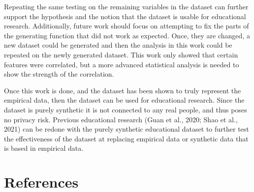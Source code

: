 \documentclass{article}
\begin{document}
\label{sec:future_work}

Repeating the same testing on the remaining variables in the dataset can further support the hypothesis and the notion that the dataset is usable for educational research. Additionally, future work should focus on attempting to fix the parts of the generating function that did not work as expected. Once, they are changed, a new dataset could be generated and then the analysis in this work could be repeated on the newly generated dataset. This work only showed that certain features were correlated, but a more advanced statistical analysis is needed to show the strength of the correlation.

Once this work is done, and the dataset has been shown to truly represent the empirical data, then the dataset can be used for educational research. Since the dataset is purely synthetic it is not connected to any real people, and thus poses no privacy risk. Previous educational research (Guan et al., 2020; Shao et al., 2021) can be redone with the purely synthetic educational dataset to further test the effectiveness of the dataset at replacing empirical data or synthetic data that is based in empirical data.

\section*{References}\label{references}
\end{document}
